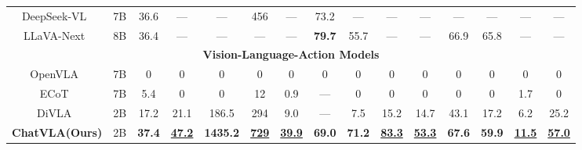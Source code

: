 \begin{table*}[tb]
{\begin{tabular}{c|c|cccccc|ccccccc}
        DeepSeek-VL~\cite{lu2024deepseek-vl} & 7B & 36.6 & — & — & 456 & — & 73.2 & — & — & — & — & — & — & — \\
        LLaVA-Next~\cite{li2024llavanext-strong} & 8B & 36.4 & — & — & — & — &  \textbf{79.7} & 55.7 & — & — & 66.9 & 65.8 & — & — \\
        \midrule
        \multicolumn{15}{c}{\textbf{Vision-Language-Action Models}} \\
        \midrule
        OpenVLA~\cite{kim24openvla} & 7B & 0 & 0& 0& 0& 0& 0& 0& 0& 0 & 0& 0& 0& 0\\
        ECoT~\cite{ecot}     & 7B & 5.4 & 0 & 0 & 12 & 0.9 & — & 0 & 0 & 0 & 0 & 0 & 1.7 & 0 \\
        DiVLA~\cite{diffusionvla} & 2B & 17.2 & 21.1 & 186.5 & 294 & 9.0 & — & 7.5 & 15.2 & 14.7 & 43.1 & 17.2 & 6.2 & 25.2\\
       \textbf{ChatVLA(Ours)} & 2B & \textbf{37.4} & \textbf{\underline{47.2}} & \textbf{1435.2} & \textbf{\underline{729}} & \textbf{\underline{39.9}} & \textbf{69.0} & \textbf{71.2} & \textbf{\underline{83.3}} & \textbf{\underline{53.3}} & \textbf{67.6} & \textbf{59.9} & \textbf{\underline{11.5}} & \textbf{\underline{57.0}} \\
        \bottomrule
      \end{tabular}
  }
\end{table*}
